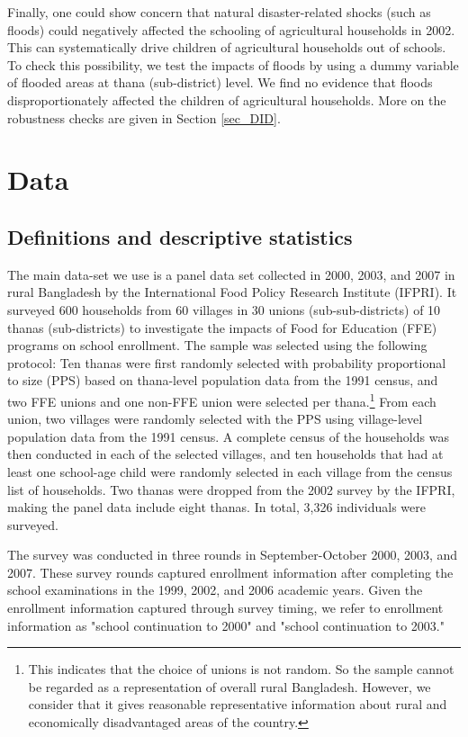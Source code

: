 \documentclass[12pt,letterpaper]{article}\usepackage[margin=1in]{geometry}
\newcommand{\0}{\ensuremath{\mbox{\boldmath $0$}}}
\begin{document}
Finally, one could show concern that natural disaster-related shocks (such as floods) could negatively affected the schooling of agricultural households in 2002. This can systematically drive children of agricultural households out of schools. To check this possibility, we test the impacts of floods by using a dummy variable of flooded areas at thana (sub-district) level. We find no evidence that floods disproportionately affected the children of agricultural households. More on the robustness checks are given in Section \ref{sec_DID}. 

\section{Data} 
\subsection{Definitions and descriptive statistics}

The main data-set we use is a panel data set collected in 2000, 2003, and 2007 in rural Bangladesh by the International Food Policy Research Institute (IFPRI). It surveyed 600 households from 60 villages in 30 unions (sub-sub-districts) of 10 thanas (sub-districts) to investigate the impacts of Food for Education (FFE) programs on school enrollment. The sample was selected using the following protocol: Ten thanas were first randomly selected with probability proportional to size (PPS) based on thana-level population data from the 1991 census, and two FFE unions and one non-FFE union were selected per thana.\footnote{This indicates that the choice of unions is not random. So the sample cannot be regarded as a representation of overall rural Bangladesh. However, we consider that it gives reasonable representative information about rural and economically disadvantaged areas of the country. } From each union, two villages were randomly selected with the PPS using village-level population data from the 1991 census. A complete census of the households was then conducted in each of the selected villages, and ten households that had at least one school-age child were randomly selected in each village from the census list of households. Two thanas were dropped from the 2002 survey by the IFPRI, making the panel data include eight thanas. In total, 3,326 individuals were surveyed. 

The survey was conducted in three rounds in September-October 2000, 2003, and 2007. These survey rounds captured enrollment information after completing the school examinations in the 1999, 2002, and 2006 academic years. Given the enrollment information captured through survey timing, we refer to enrollment information as "school continuation to 2000" and "school continuation to 2003."
\end{document}
